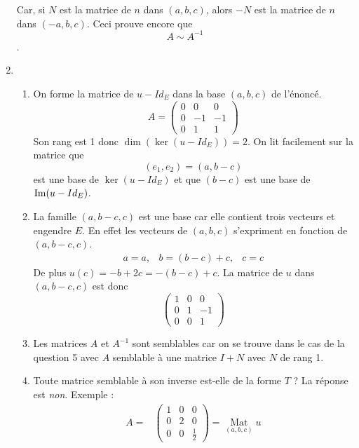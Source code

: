 \begin{enumerate}
Car, si $N$ est la matrice de $n$ dans $(a,b,c)$, alors $-N$ est la matrice de $n$ dans $(-a,b,c)$.\newline
Ceci prouve encore que 
\begin{displaymath}
 A \sim A^{-1}
\end{displaymath}
.
\item \begin{enumerate}
 \item On forme la matrice de $u-Id_E$ dans la base $(a,b,c)$ de l'énoncé.
\[
A= \begin{pmatrix}
0 & 0 & 0 \\
0 & -1 & -1 \\
0 & 1 & 1
          \end{pmatrix} \]
Son rang est 1 donc $\dim (\ker (u-Id_E))=2$.\newline
On lit facilement sur la matrice que 
\begin{displaymath}
 (e_1,e_2)=(a,b-c)
\end{displaymath}
est une base de $\ker (u-Id_E)$ et que $(b-c)$ est une base de $\operatorname{Im} (u-Id_E)$.
\item La famille $(a,b-c,c)$ est une base car elle contient trois vecteurs et engendre $E$.\newline
En effet les vecteurs de $(a,b,c)$ s'expriment en fonction de $(a,b-c,c)$.
\[
\begin{array}{ccc}
a=a , & b= (b-c) +c , & c=c 
  \end{array}\]
De plus $u(c)=-b+2c=-(b-c)+c$. La matrice de $u$ dans $(a,b-c,c)$ est donc 
\[
\begin{pmatrix}
1 & 0 & 0 \\
0 & 1 & -1 \\
0 & 0 & 1
\end{pmatrix}
 \]
\item Les matrices $A$ et $A^{-1}$ sont semblables car on se trouve dans le cas de la question 5 avec $A$ semblable à une matrice $I+N$ avec $N$ de rang 1.
\item Toute matrice semblable à son inverse est-elle de la forme $T$ ?\newline
La réponse est \emph{non}. Exemple :
\begin{align*}
 A  =&
 \begin{pmatrix}
 1 & 0 & 0 \\
 0 & 2 & 0 \\
 0 & 0 & \frac{1}{2}
 \end{pmatrix} 
= \underset{(a,b,c)}{\mathop{\mathrm{Mat}}}u\\

\end{align*}
\end{enumerate}
\end{enumerate}
